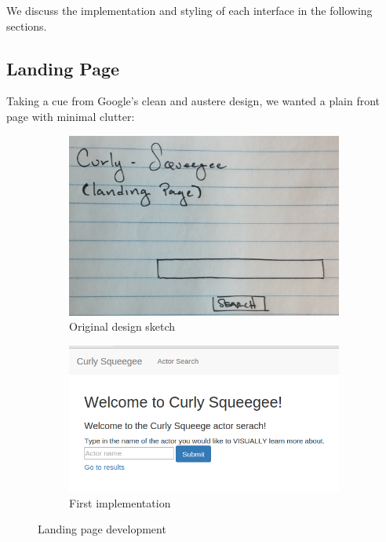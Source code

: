 \documentclass[12pt]{article}
\begin{document}
We discuss the implementation and styling of each interface in the following sections.

\subsection{Landing Page}

  Taking a cue from Google's clean and austere design, we wanted a plain front page with minimal clutter:
  
	\begin{figure}[h!]
		\centering
		\begin{subfigure}[t]{.5\textwidth}
			  \centering
			  \includegraphics[scale=0.2]{images/landingPage_crop.png}
			  \caption{Original design sketch}
			  \label{fig:sub1}
		\end{subfigure}%
		\begin{subfigure}[t]{.5\textwidth}
			  \centering
			  \includegraphics[scale=0.4]{images/landingPage.png}
			  \caption{First implementation}
			  \label{fig:sub2}
		\end{subfigure}%
		\caption{Landing page development}
		\label{fig:landingPage}
	\end{figure}
\end{document}
